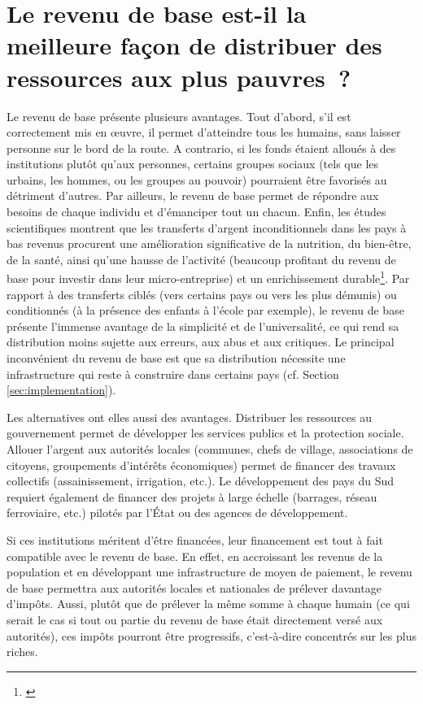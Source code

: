\documentclass[a5paper,french,openany]{memoir}
\begin{document}
\section*{\normalsize Le revenu de base est-il la meilleure façon de distribuer des ressources aux plus pauvres~?}\label{q:rdb}

Le revenu de base présente plusieurs avantages. Tout d'abord, s'il est correctement mis en œuvre, il permet d'atteindre tous les humains, sans laisser personne sur le bord de la route. A contrario, si les fonds étaient alloués à des institutions plutôt qu'aux personnes, certains groupes sociaux (tels que les urbains, les hommes, ou les groupes au pouvoir) pourraient être favorisés au détriment d'autres. Par ailleurs, le revenu de base permet de répondre aux besoins de chaque individu et d'émanciper tout un chacun. Enfin, les études scientifiques montrent que les transferts d'argent inconditionnels dans les pays à bas revenus procurent une amélioration significative de la nutrition, du bien-être, de la santé, ainsi qu'une hausse de l'activité (beaucoup profitant du revenu de base pour investir dans leur micro-entreprise) et un enrichissement durable\footnote{\cite{haushofer_short-term_2016,egger_general_2022,standing_little_2014}}. Par rapport à des transferts ciblés (vers certains pays ou vers les plus démunis) ou conditionnés (à la présence des enfants à l'école par exemple), le revenu de base présente l'immense avantage de la simplicité et de l'universalité, ce qui rend sa distribution moins sujette aux erreurs, aux abus et aux critiques. Le principal inconvénient du revenu de base est que sa distribution nécessite une infrastructure qui reste à construire dans certains pays (cf. Section \ref{sec:implementation}).  %

Les alternatives ont elles aussi des avantages. Distribuer les ressources au gouvernement permet de développer les services publics et la protection sociale. Allouer l'argent aux autorités locales (communes, chefs de village, associations de citoyens, groupements d'intérêts économiques) permet de financer des travaux collectifs (assainissement, irrigation, etc.). Le développement des pays du Sud requiert également de financer des projets à large échelle (barrages, réseau ferroviaire, etc.) pilotés par l'État ou des agences de développement. 

Si ces institutions méritent d'être financées, leur financement est tout à fait compatible avec le revenu de base. En effet, en accroissant les revenus de la population et en développant une infrastructure de moyen de paiement, le revenu de base permettra aux autorités locales et nationales de prélever davantage d'impôts. Aussi, plutôt que de prélever la même somme à chaque humain (ce qui serait le cas si tout ou partie du revenu de base était directement versé aux autorités), ces impôts pourront être progressifs, c'est-à-dire concentrés sur les plus riches. 
\end{document}
